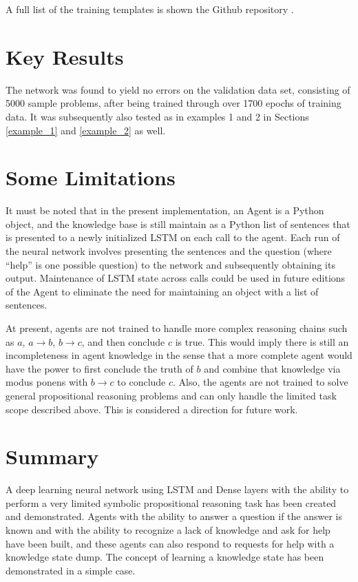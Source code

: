 \documentclass{article}
\begin{document}
A full list of the training templates is shown the Github repository
\cite{github_repo}.

\section{Key Results}

The network was found to yield no errors on the validation data set,
consisting of 5000 sample problems, after being trained through over 1700
epochs of
training data.  It was subsequently also tested as in examples 1 and 2
in Sections \ref{example_1} and \ref{example_2} as well.

\section{Some Limitations}

It must be noted that in the present implementation, an Agent is a Python
object, and the knowledge base is still maintain as a Python list of
sentences that is presented to a newly initialized LSTM on each call to
the agent.  Each run of the neural network involves presenting the
sentences and the question (where ``help'' is one possible question)
to the network and subsequently obtaining its output.  Maintenance of LSTM
state across calls could be used in future editions of the Agent to eliminate the need
for maintaining an object with a list of sentences.

At present, agents are not trained to
handle more complex reasoning chains such as $a$, $a \rightarrow b$,
$b \rightarrow c$, and then conclude $c$ is true.  This would imply there
is still an incompleteness in agent knowledge in the sense that a more complete
agent would have the power to first conclude the truth of $b$ and combine
that knowledge via modus ponens with $b \rightarrow c$ to conclude $c$.
Also, the agents are not trained to solve general propositional reasoning
problems and can only handle the limited task scope described above.
This is considered a direction for future work.

\section{Summary}

A deep learning neural network using LSTM and Dense layers with the ability
to perform a very limited symbolic propositional reasoning task has been created
and demonstrated.  Agents with the ability to answer a question if the answer
is known and with the ability to recognize a lack of knowledge and ask for
help have been built, and these agents can also respond to requests for help
with a knowledge state dump.  The concept of learning a knowledge state
has been demonstrated in a simple case.
\end{document}
